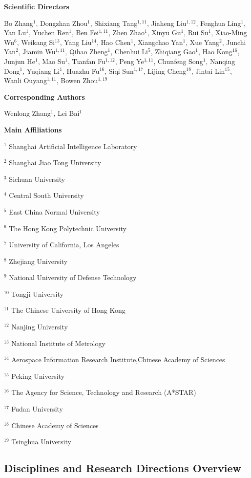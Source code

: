 \textbf{Scientific Directors}

Bo Zhang$^{1}$, Dongzhan Zhou$^{1}$, Shixiang Tang$^{1,11}$, Jiaheng Liu$^{1,12}$, Fenghua Ling$^{1}$, Yan Lu$^{1}$, Yuchen Ren$^{1}$, Ben Fei$^{1,11}$, Zhen Zhao$^{1}$, Xinyu Gu$^{1}$, Rui Su$^{1}$, Xiao-Ming Wu$^{6}$, Weikang Si$^{13}$, Yang Liu$^{14}$, Hao Chen$^{1}$, Xiangchao Yan$^{1}$, Xue Yang$^{2}$, Junchi Yan$^{2}$, Jiamin Wu$^{1,11}$, Qihao Zheng$^{1}$, Chenhui Li$^{5}$, Zhiqiang Gao$^{1}$, Hao Kong$^{16}$, Junjun He$^{1}$, Mao Su$^{1}$, Tianfan Fu$^{1,12}$, Peng Ye$^{1,11}$, Chunfeng Song$^{1}$, Nanqing Dong$^{1}$, Yuqiang Li$^{1}$, Huazhu Fu$^{16}$, Siqi Sun$^{1,17}$, Lijing Cheng$^{18}$, Jintai Lin$^{15}$, Wanli Ouyang$^{1,11}$, Bowen Zhou$^{1,19}$


\textbf{Corresponding Authors}

Wenlong Zhang$^{1}$, Lei Bai$^{1}$

\textbf{Main Affiliations}

$^1$ Shanghai Artificial Intelligence Laboratory

$^2$ Shanghai Jiao Tong University

$^3$ Sichuan University

$^4$ Central South University

$^5$ East China Normal University

$^6$ The Hong Kong Polytechnic University

$^7$ University of California, Los Angeles

$^8$ Zhejiang University

$^9$ National University of Defense Technology

$^{10}$ Tongji University

$^{11}$ The Chinese University of Hong Kong

$^{12}$ Nanjing University

$^{13}$ National Institute of Metrology

$^{14}$ Aerospace Information Research Institute,Chinese Academy of Sciences

$^{15}$ Peking University

$^{16}$ The Agency for Science, Technology and Research (A*STAR)

$^{17}$ Fudan University

$^{18}$ Chinese Academy of Sciences

$^{19}$ Tsinghua University


\subsection{Disciplines and Research Directions Overview}
\label{sec: all disciplines}

